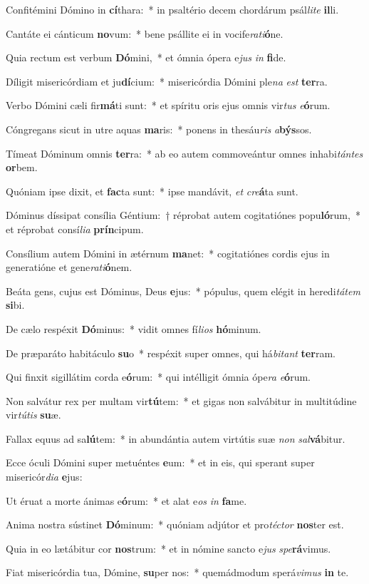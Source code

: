 \item Confitémini Dómino in \textbf{cí}thara:~* in psaltério decem chordárum psál\textit{li}\textit{te} \textbf{il}li.
\item Cantáte ei cánticum \textbf{no}vum:~* bene psállite ei in vocife\textit{ra}\textit{ti}\textbf{ó}ne.
\item Quia rectum est verbum \textbf{Dó}mini,~* et ómnia ópera e\textit{jus} \textit{in} \textbf{fi}de.
\item Díligit misericórdiam et ju\textbf{dí}cium:~* misericórdia Dómini ple\textit{na} \textit{est} \textbf{ter}ra.
\item Verbo Dómini cæli fir\textbf{má}ti sunt:~* et spíritu oris ejus omnis vir\textit{tus} \textit{e}\textbf{ó}rum.
\item Cóngregans sicut in utre aquas \textbf{ma}ris:~* ponens in thesáu\textit{ris} \textit{a}\textbf{býs}sos.
\item Tímeat Dóminum omnis \textbf{ter}ra:~* ab eo autem commoveántur omnes inhabi\textit{tán}\textit{tes} \textbf{or}bem.
\item Quóniam ipse dixit, et \textbf{fac}ta sunt:~* ipse mandávit, \textit{et} \textit{cre}\textbf{á}ta sunt.
\item Dóminus díssipat consília Géntium:~† réprobat autem cogitatiónes popu\textbf{ló}rum,~* et réprobat consí\textit{li}\textit{a} \textbf{prín}cipum.
\item Consílium autem Dómini in ætérnum \textbf{ma}net:~* cogitatiónes cordis ejus in generatióne et gene\textit{ra}\textit{ti}\textbf{ó}nem.
\item Beáta gens, cujus est Dóminus, Deus \textbf{e}jus:~* pópulus, quem elégit in heredi\textit{tá}\textit{tem} \textbf{si}bi.
\item De cælo respéxit \textbf{Dó}minus:~* vidit omnes fí\textit{li}\textit{os} \textbf{hó}minum.
\item De præparáto habitáculo \textbf{su}o~* respéxit super omnes, qui há\textit{bi}\textit{tant} \textbf{ter}ram.
\item Qui finxit sigillátim corda e\textbf{ó}rum:~* qui intélligit ómnia ópe\textit{ra} \textit{e}\textbf{ó}rum.
\item Non salvátur rex per multam vir\textbf{tú}tem:~* et gigas non salvábitur in multitúdine vir\textit{tú}\textit{tis} \textbf{su}æ.
\item Fallax equus ad sa\textbf{lú}tem:~* in abundántia autem virtútis suæ \textit{non} \textit{sal}\textbf{vá}bitur.
\item Ecce óculi Dómini super metuéntes \textbf{e}um:~* et in eis, qui sperant super misericór\textit{di}\textit{a} \textbf{e}jus:
\item Ut éruat a morte ánimas e\textbf{ó}rum:~* et alat e\textit{os} \textit{in} \textbf{fa}me.
\item Anima nostra sústinet \textbf{Dó}minum:~* quóniam adjútor et pro\textit{téc}\textit{tor} \textbf{nos}ter est.
\item Quia in eo lætábitur cor \textbf{nos}trum:~* et in nómine sancto e\textit{jus} \textit{spe}\textbf{rá}vimus.
\item Fiat misericórdia tua, Dómine, \textbf{su}per nos:~* quemádmodum sperá\textit{vi}\textit{mus} \textbf{in} te.
